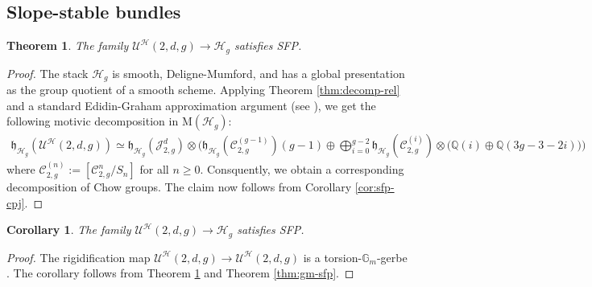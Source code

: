 \documentclass[11pt]{amsart}
\newtheorem{theorem}{Theorem}[section]
\newtheorem{corollary}{Corollary}[theorem]
\theoremstyle{definition}
\newcommand{\ri}{\rightarrow}
\newcommand{\jac}{\mathcal{J}}
\newcommand{\h}{\mathcal{H}}
\newcommand{\U}{\mathscr{U}}
\newcommand{\mC}{\mathcal{C}}
\newcommand{\gm}{\mathbb{G}_m}
\begin{document}
\subsection{Slope-stable bundles}

\begin{theorem}\label{thm:sfp-u}
	The family $\mathcal{U}^\h(2,d,g)\ri \h_g$ satisfies SFP.
\end{theorem}
\begin{proof}
	The stack $\h_g$ is smooth, Deligne-Mumford, and has a global presentation as the group quotient of a smooth scheme.
Applying Theorem \ref{thm:decomp-rel} and a standard Edidin-Graham approximation argument (see \cite[Definition-Proposition 1, and Propositions 14-15]{edidin-graham}), we get the following motivic decomposition in $\mathrm M(\mathcal H_g)$:
\begin{align*}       
\mathfrak h_{\h_g} (\mathcal{U}^\h(2,d,g))\simeq \mathfrak h_{\h_g} (\jac^d_{2,g}) \otimes  \Biggl(\mathfrak h _{\h_g}( \mathcal C^{(g-1)}_{2,g})(g-1) \oplus  \bigoplus_{i=0}^{g-2} \mathfrak h_{\h_g}(\mathcal C_{2,g}^{(i)}) \otimes 
 \biggl(\mathbb Q(i) \oplus \mathbb Q(3g-3-2i)  \biggr)\Biggr)
\end{align*}
where $\mC_{2,g}^{(n)}:= [\mC_{2,g}^n/S_n]$ for all $n\geq 0$. Consquently, we obtain a corresponding decomposition of Chow groups. The claim now follows from Corollary \ref{cor:sfp-cpj}.
\end{proof}


\begin{corollary}\label{cor:sfp-u}
	The family $\U^\h(2,d,g)\ri \h_g$ satisfies SFP.
\end{corollary}
\begin{proof}
The rigidification map $\U^\h(2,d,g)\ri \mathcal{U}^\h(2,d,g)$ is a torsion-$\gm$-gerbe \cite[Theorem B]{brauer}. 
The corollary follows from Theorem \ref{thm:sfp-u} and Theorem \ref{thm:gm-sfp}.
\end{proof}
\end{document}
